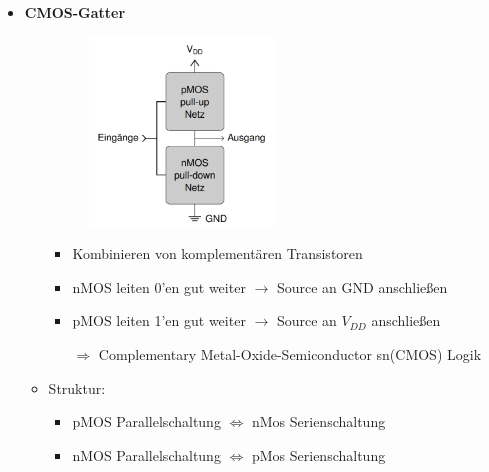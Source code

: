 \documentclass[11pt,a4paper]{article}
\begin{document}
\begin{itemize}
\item \textbf{CMOS-Gatter}
	\begin{itemize}
		\item[]		
			\begin{minipage}{0.3\textwidth}
				\begin{figure}[H]
				\includegraphics[height=5cm]{cmos}
				\end{figure}
			\end{minipage}
			\begin{minipage}[t]{0.7\textwidth}
				\vspace{-1.25cm}
				\begin{itemize}
				\item Kombinieren von komplementären Transistoren
				\item nMOS leiten 0'en gut weiter $\rightarrow$ Source an GND anschließen
				\item pMOS leiten 1'en gut weiter $\rightarrow$ Source an $V_{DD}$ anschließen
				\item[$\Rightarrow$] Complementary Metal-Oxide-Semiconductor sn(CMOS) Logik
				\end{itemize}
			\end{minipage}	
		
		\item Struktur: 
			\begin{itemize}
			\item pMOS Parallelschaltung $\Leftrightarrow$ nMos Serienschaltung
			\item nMOS Parallelschaltung $\Leftrightarrow$ pMos Serienschaltung
			\end{itemize}
		

\end{itemize}
\end{itemize}
\end{document}
